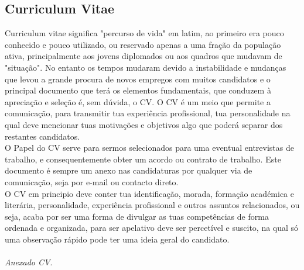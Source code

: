 \subsection{Curriculum Vitae}
\qquad Curriculum vitae significa "percurso de vida" em latim, ao primeiro era pouco conhecido e pouco utilizado, ou reservado apenas a uma fração da população ativa, principalmente aos jovens diplomados ou aos quadros que mudavam de "situação". No entanto os tempos mudaram devido a instabilidade e mudanças que levou a grande procura de novos empregos com muitos candidatos e o principal documento que terá os elementos fundamentais, que conduzem à apreciação e seleção é, sem dúvida, o CV.\cite{book_12}
O CV é um meio que permite a comunicação, para transmitir tua experiência profissional, tua personalidade na qual deve mencionar tuas motivações e objetivos algo que poderá separar dos restantes candidatos. \\
O Papel do CV serve para sermos selecionados para uma eventual entrevistas de trabalho, e consequentemente obter um acordo ou contrato de trabalho. Este documento é sempre um anexo nas candidaturas por qualquer via de comunicação, seja por e-mail ou contacto direto. \\
O CV em principio deve conter tua identificação, morada, formação académica e literária, personalidade, experiência profissional e outros assuntos relacionados, ou seja, acaba por ser uma forma de divulgar as tuas competências de forma ordenada e organizada, para ser apelativo deve ser percetível e suscito, na qual só uma observação rápido pode ter uma ideia geral do candidato. \\
\\
\textit{Anexado CV}. \\
